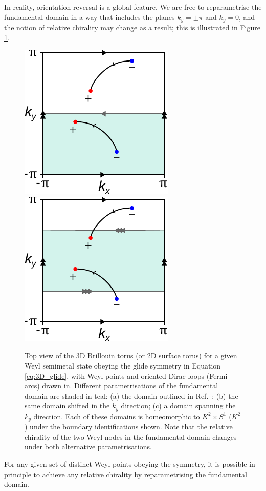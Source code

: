 In reality, orientation reversal is a global feature. We are free to reparametrise the fundamental domain in a way that includes the planes $k_y=\pm\pi$ and $k_y=0$, and the notion of relative chirality may change as a result; this is illustrated in Figure \ref{fig:BZ_param}.
\begin{figure}[htb!]
	\centering
	 {\includegraphics[width=.3\textwidth]{Images/BZ_basic}}
	\hfil
	 {\includegraphics[width=.3\textwidth]{Images/BZ_mid}}
	\hfil
	\caption{Top view of the 3D Brillouin torus (or 2D surface torus) for a given Weyl semimetal state obeying the glide symmetry in Equation \eqref{eq:3D_glide}, with Weyl points and oriented Dirac loops (Fermi arcs) drawn in. Different parametrisations of the fundamental domain are shaded in teal: (a) the domain outlined in Ref.\ \cite{Fonseca-Vaidya_nonorientable}; (b) the same domain shifted in the $k_y$ direction; (c) a domain spanning the $k_y$ direction. Each of these domains is homeomorphic to $K^2\times S^1$ ($K^2$) under the boundary identifications shown. Note that the relative chirality of the two Weyl nodes in the fundamental domain changes under both alternative parametrisations.}
	\label{fig:BZ_param}
\end{figure}
For any given set of distinct Weyl points obeying the symmetry, it is possible in principle to achieve any relative chirality by reparametrising the fundamental domain. 

